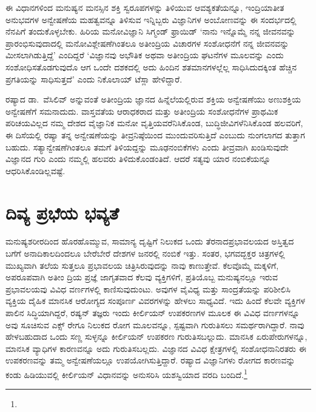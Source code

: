ಈ ವಿಧಾನಗಳಿಂದ ಮನುಷ್ಯನ ಮನಸ್ಸಿನ ಶಕ್ತಿ ಸ್ವರೂಪಗಳನ್ನು ತಿಳಿಯುವ ಆವಶ್ಯಕತೆಯನ್ನೂ, ಇಂದ್ರಿಯಾತೀತ ಅನುಭವಗಳ ಅನ್ವೇಷಣೆಯ ಮಹತ್ವವನ್ನೂ ತಿಳಿಸುವ ಇನ್ನಿಬ್ಬರು ವಿಜ್ಞಾನಿಗಳ ಅಂಬೋಣವನ್ನು ಈ ಸಂದರ್ಭದಲ್ಲಿ ನೆನಪಿಗೆ ತಂದುಕೊಳ್ಳಬೇಕು. ಹಿರಿಯ ಮನೋ\-ವಿಜ್ಞಾನಿ ಸಿಗ್ಮಂಡ್ ಫ್ರಾಯಿಡ್ ‘ನಾನು ಇನ್ನೊಮ್ಮೆ ನನ್ನ ಜೀವನವನ್ನು ಪ್ರಾರಂಭಿಸುವು\-ದಾದಲ್ಲಿ ಮನೋವಿಶ್ಲೇಷಣೆಗಿಂತಲೂ ಅತೀಂದ್ರಿಯ ವಿಚಾರಗಳ ಸಂಶೋಧನೆಗೆ ನನ್ನ ಜೀವನವನ್ನು ಮೀಸ\-ಲಾಗಿಡುತ್ತಿದ್ದೆ’ ಎಂದಿದ್ದರೆ ‘ವಿಜ್ಞಾನವು ಅಭೌತಿಕ ಅಥವಾ ಅತೀಂದ್ರಿಯ ಘಟನೆಗಳ ಮೂಲವನ್ನು ಎಂದು ಸಂಶೋಧಿಸತೊಡಗುವುದೊ ಆಗ ಒಂದೇ ದಶಕದಲ್ಲಿ ಅದು ಹಿಂದಿನ ಶತಮಾನಗಳ\-ಲ್ಲೆಲ್ಲ ಸಾಧಿಸಿದುದಕ್ಕಿಂತ ಹೆಚ್ಚಿನ ಪ್ರಗತಿಯನ್ನು ಸಾಧಿಸುತ್ತದೆ’ ಎಂದು ನಿಕೊಲಾಯ್ ಟೆಸ್ಲಾ ಹೇಳಿದ್ದಾರೆ.

ರಷ್ಯಾದ ಡಾ.\ ವೆಸಿಲಿವ್ ಅನ್ನುವಂತೆ ಅತೀಂದ್ರಿಯ ಜ್ಞಾನದ ಹಿನ್ನೆಲೆಯಲ್ಲಿರುವ ಶಕ್ತಿಯ ಅನ್ವೇಷಣೆಯು ಅಣುಶಕ್ತಿಯ ಅನ್ವೇಷಣೆಗೆ ಸಮನಾದುದು. ವಾಸ್ತವತೆಯ ಆರಾಧಕರಾದ ಮತ್ತು ಅತೀಂದ್ರಿಯ ಸಂಶೋಧನೆಗಳ ಪ್ರಾಥಮಿಕ ಪರಿಚಯವಿಲ್ಲದ ನಮ್ಮ ದೇಶದ ವೈಜ್ಞಾನಿಕ ಮನೋ ವೃತ್ತಿಯವರೆನಿಸಿಕೊಂಡ, ಬುದ್ಧಿಜೀವಿಗಳೆನಿಸಿಕೊಂಡ ಹಲವರಿಗೆ, ಈ ದಿಸೆಯಲ್ಲಿ ರಷ್ಯಾ ತನ್ನ ಅನ್ವೇಷಣೆಯನ್ನು ತೀವ್ರನಿಷ್ಠೆಯಿಂದ ಮುಂದುವರಿಸುತ್ತಿದೆ ಎಂಬುದು ನುಂಗಲಾಗದ ತುತ್ತಾಗ ಬಹುದು. ಸತ್ಯಾನ್ವೇಷಣೆಗಿಂತಲೂ ತಮಗೆ ತಿಳಿಯದ್ದನ್ನು ಮೂಢನಂಬಿಕೆಗಳು ಎಂದು ತೀವ್ರವಾಗಿ ಖಂಡಿಸುವುದೇ ವಿಜ್ಞಾನದ ಗುರಿ ಎಂದು ನಮ್ಮಲ್ಲಿ ಹಲವರು ತಿಳಿದುಕೊಂಡಂತಿದೆ. ಆದರೆ ಸತ್ಯವು ಯಾರ ನಂಬಿಕೆಯನ್ನೂ ಆಧರಿಸಿಕೊಂಡಿಲ್ಲವಷ್ಟೆ.


\section*{ದಿವ್ಯ ಪ್ರಭೆಯ ಭವ್ಯತೆ}


ಮನುಷ್ಯಶರೀರದಿಂದ ಹೊರಹೊಮ್ಮುವ, ಸಾಮಾನ್ಯ ದೃಷ್ಟಿಗೆ ನಿಲುಕದ ಒಂದು ತೆರನಾದ\break ಪ್ರಭಾವಲಯದ ಅಸ್ತಿತ್ವದ ಬಗೆಗೆ ಅನಾದಿಕಾಲದಿಂದಲೂ ಬೇರೆಬೇರೆ ದೇಶಗಳ ಜನರಲ್ಲಿ ನಂಬಿಕೆ ಇತ್ತು. ಸಂತರ, ಭಗವದ್ಭಕ್ತರ ಚಿತ್ರಗಳಲ್ಲಿ ಮುಖ್ಯವಾಗಿ ತಲೆಯ ಸುತ್ತಲೂ ಪ್ರಭಾವಲಯ ಚಿತ್ರಿಸಿರುವುದನ್ನು ನಾವು ಕಾಣುತ್ತೇವೆ. ಕೆಲವೊಮ್ಮೆ ಮಕ್ಕಳಿಗೆ, ಅಪರೂಪವಾಗಿ ಅತೀಂ ದ್ರಿಯ ಪ್ರಜ್ಞೆ ಜಾಗೃತವಾದ ಕೆಲವು ವ್ಯಕ್ತಿಗಳಿಗೆ, ಪ್ರತಿಯೊಬ್ಬ ಮನುಷ್ಯನಲ್ಲೂ ಇರುವ ಪ್ರಭಾವಲಯವು ವಿವಿಧ ವರ್ಣಗಳಲ್ಲಿ ಕಾಣಿಸುವುದುಂಟು. ಅವುಗಳ ವೈವಿಧ್ಯ ಮತ್ತು ಸಾಂದ್ರತೆಯನ್ನು ಪರಿಶೀಲಿಸಿ ವ್ಯಕ್ತಿಯ ದೈಹಿಕ ಮಾನಸಿಕ ಆರೋಗ್ಯದ ಸಂಪೂರ್ಣ ವಿವರಗಳನ್ನು ಹೇಳಲು ಸಾಧ್ಯವಿದೆ. ಇದು ಹಿಂದೆ ಕೆಲವೇ ವ್ಯಕ್ತಿಗಳ ಪಾಲಿನ ಸಿದ್ಧಿಯಾಗಿದ್ದರೆ, ರಷ್ಯನ್ ತಜ್ಞರು ಇಂದು ಕೀರ್ಲಿಯನ್ ಉಪಕರಣಗಳ ಮೂಲಕ ಈ ವಿವಿಧ ವರ್ಣಗಳನ್ನೂ ಅವು ಸೂಚಿಸುವ ಎಕ್ಸ್ ರೇಗೂ ನಿಲುಕದ ರೋಗ ಮೂಲವನ್ನೂ, ಸ್ಪಷ್ಟವಾಗಿ ಗುರುತಿಸಲು ಸಮರ್ಥರಾಗಿದ್ದಾರೆ. ನಾವು ಹೇಳಬಹುದಾದ ಒಂದು ಸಣ್ಣ ಸುಳ್ಳನ್ನೂ ಕೀರ್ಲಿಯನ್ ಉಪಕರಣ ಗುರುತಿಸಬಲ್ಲುದು. ಮಾನಸಿಕ ಏರುಪೇರುಗಳನ್ನೂ, ಮಾನಸಿಕ ವ್ಯಾಧಿಗಳ ಕಾರಣವನ್ನೂ ಅದು ಗುರುತಿಸಬಲ್ಲದು. ವಿಜ್ಞಾನದ ವಿವಿಧ ಕ್ಷೇತ್ರಗಳಲ್ಲಿ ಸಂಶೋಧನಾನಿರತರು ಈ ಉಪಕರಣವನ್ನು ತಮ್ಮ ಅನ್ವೇಷಣೆಯಲ್ಲೂ ಉಪಯೋಗಿಸುತ್ತಿದ್ದಾರೆ. ರಷ್ಯಾದ ವಿಜ್ಞಾನಿಗಳು ರೋಗದ ಕಾರಣವನ್ನು ಕಂಡು ಹಿಡಿಯುವಲ್ಲಿ ಕೀರ್ಲಿಯನ್ ವಿಧಾನವನ್ನು ಅನುಸರಿಸಿ ಯಶಸ್ವಿಯಾದ ವರದಿ ಬಂದಿದೆ.\footnote{\hfill{}}

